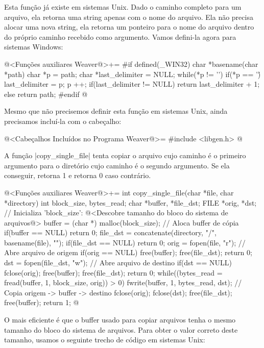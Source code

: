 
Esta função já existe em sistemas Unix. Dado o caminho completo para
um arquivo, ela retorna uma string apenas com o nome do arquivo. Ela
não precisa alocar uma nova string, ela retorna um ponteiro para o
nome do arquivo dentro do próprio caminho recebido como argumento.
Vamos defini-la agora para sistemas Windows:

\iniciocodigo
@<Funções auxiliares Weaver@>+=
#if defined(_WIN32)
char *basename(char *path){
  char *p = path;
  char *last_delimiter = NULL;
  while(*p != '\0'){
    if(*p == '\')
      last_delimiter = p;
    p ++;
  }
  if(last_delimiter != NULL)
    return last_delimiter + 1;
  else
    return path;
}
#endif
@
\fimcodigo

Mesmo que não precisemos definir esta função em sistemas Unix, ainda
precisamos incluí-la com o cabeçalho:

\iniciocodigo
@<Cabeçalhos Incluídos no Programa Weaver@>=
#include <libgen.h>
@
\fimcodigo


A função |copy_single_file| tenta copiar o
arquivo cujo caminho é o primeiro argumento para o diretório cujo
caminho é o segundo argumento. Se ela conseguir, retorna 1 e retorna 0
caso contrário.

\iniciocodigo
@<Funções auxiliares Weaver@>+=
int copy_single_file(char *file, char *directory){
  int block_size, bytes_read;
  char *buffer, *file_dst;
  FILE *orig, *dst;
  // Inicializa 'block_size':
  @<Descobre tamanho do bloco do sistema de arquivos@>
  buffer = (char *) malloc(block_size); // Aloca buffer de cópia
  if(buffer == NULL) return 0;
  file_dst = concatenate(directory, "/", basename(file), "");
  if(file_dst == NULL) return 0;
  orig = fopen(file, "r"); // Abre arquivo de origem
  if(orig == NULL){
    free(buffer);
    free(file_dst);
    return 0;
  }
  dst = fopen(file_dst, "w"); // Abre arquivo de destino
  if(dst == NULL){
    fclose(orig);
    free(buffer);
    free(file_dst);
    return 0;
  }
  while((bytes_read = fread(buffer, 1, block_size, orig)) > 0){
    fwrite(buffer, 1, bytes_read, dst); // Copia origem -> buffer -> destino
  }
  fclose(orig);
  fclose(dst);
  free(file_dst);
  free(buffer);
  return 1;
}
@
\fimcodigo

O mais eficiente é que o buffer usado para copiar arquivos tenha o
mesmo tamanho do bloco do sistema de arquivos. Para obter o valor
correto deste tamanho, usamos o seguinte trecho de código em sistemas
Unix:

